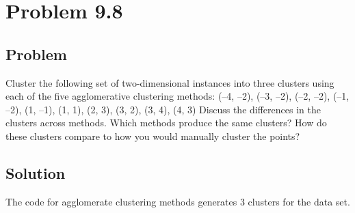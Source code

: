 \documentclass[12pt]{report}
\begin{document}
\chapter{Problem 9.8}
\section{Problem}
Cluster the following set of two-dimensional instances into three clusters using each of the five agglomerative clustering methods:
(–4, –2), (–3, –2), (–2, –2), (–1, –2), (1, –1), (1, 1), (2, 3), (3, 2), (3, 4), (4, 3)
Discuss the differences in the clusters across methods. Which methods produce the same clusters? How do these clusters compare to how you would manually cluster the points?
\section{Solution}
The code for agglomerate clustering methods generates 3 clusters for the data set.
\end{document}

